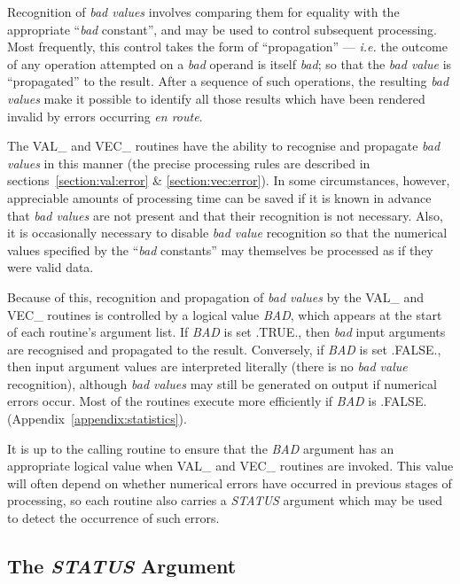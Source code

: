\documentclass[11pt,nolof]{starlink}
\providecommand{\name}[1]{\mbox{#1}}
\providecommand{\fortvar}[1]{\mbox{\emph{#1}}}
\begin{document}
Recognition of \emph{bad values} involves comparing them for equality with
the appropriate ``\emph{bad} constant'', and may be used to control
subsequent processing.
Most frequently, this control takes the form of ``propagation'' --- \emph{i.e.} the outcome of any operation attempted on a \emph{bad} operand is
itself \emph{bad}; so that the \emph{bad value} is ``propagated'' to the
result.
After a sequence of such operations, the resulting \emph{bad values} make it
possible to identify all those results which have been rendered invalid by
errors occurring \emph{en route}.

The \name{VAL\_} and \name{VEC\_} routines have the ability to recognise
and propagate \emph{bad values} in this manner (the precise processing rules
are described in sections~\ref{section:val:error} \& \ref{section:vec:error}).
In some circumstances, however, appreciable amounts of processing time can
be saved if it is known in advance that \emph{bad values} are not present and
that their recognition is not necessary.
Also, it is occasionally necessary to disable \emph{bad value} recognition so
that the numerical values specified by the ``\emph{bad} constants'' may
themselves be processed as if they were valid data.

Because of this, recognition and propagation of \emph{bad values} by the
\name{VAL\_} and \name{VEC\_} routines is controlled by a logical value
\fortvar{BAD}, which appears at the start of each routine's argument list.
If \fortvar{BAD} is set \name{.TRUE.}, then \emph{bad} input arguments are
recognised and propagated to the result.
Conversely, if \fortvar{BAD} is set \name{.FALSE.}, then input argument
values are interpreted literally (there is no \emph{bad value} recognition),
although \emph{bad values} may still be generated on output if numerical
errors occur.
Most of the routines execute more efficiently if \fortvar{BAD} is
\name{.FALSE.} (Appendix~\ref{appendix:statistics}).

It is up to the calling routine to ensure that the \fortvar{BAD} argument
has an appropriate logical value when \name{VAL\_} and \name{VEC\_} routines
are invoked.
This value will often depend on whether numerical errors have occurred in
previous stages of processing, so each routine also carries a
\fortvar{STATUS} argument which may be used to detect the occurrence of such
errors.

\subsection{The \fortvar{STATUS} Argument}
\end{document}
